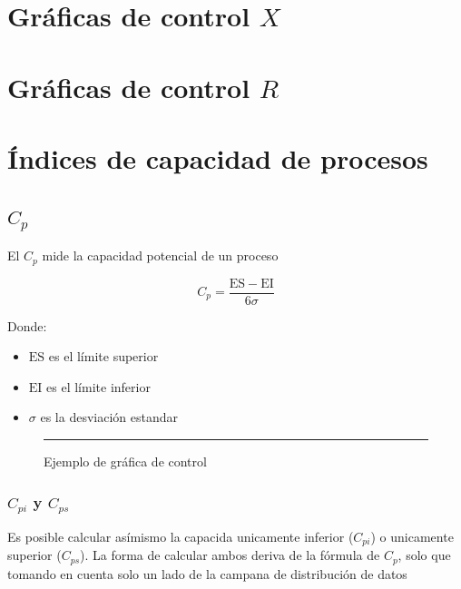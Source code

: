 

\section{Gráficas de control $X$}




\section{Gráficas de control $R$}




\section{Índices de capacidad de procesos}

\subsection{$C_{p}$}

El $C_{p}$ mide la capacidad potencial de un proceso

\begin{equation}
    C_{p} = \frac{\mathrm{ES} - \mathrm{EI}}{6\sigma}
\end{equation}

Donde:

\begin{itemize}
    \item $\mathrm{ES}$ es el límite superior
    \item $\mathrm{EI}$ es el límite inferior
    \item $\sigma$ es la desviación estandar
\end{itemize}

\begin{figure}\centering
    \resizebox{\linewidth}{!}{}
    \rule{\linewidth}{0.5pt}
    \caption{Ejemplo de gráfica de control}
    \label{fig:grafica_de_control}
\end{figure}

\subsubsection{$C_{pi}$ y $C_{ps}$}

Es posible calcular asímismo la capacida unicamente inferior ($C_{pi}$) o unicamente superior ($C_{ps}$). La forma de calcular ambos deriva de la fórmula de $C_{p}$, solo que tomando en cuenta solo un lado de la campana de distribución de datos

